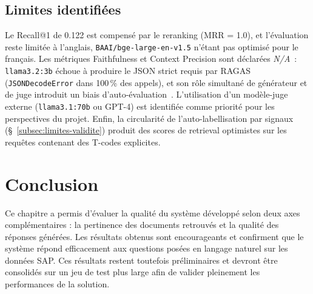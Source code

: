 \subsection{Limites identifiées}
\label{subsec:limites-ragas}

Le Recall@1 de 0.122 est compensé par le reranking (MRR = 1.0), et l'évaluation reste limitée à l'anglais, \texttt{BAAI/bge-large-en-v1.5} n'étant pas optimisé pour le français. Les métriques Faithfulness et Context Precision sont déclarées \textit{N/A}~: \texttt{llama3.2:3b} échoue à produire le JSON strict requis par RAGAS (\texttt{JSONDecodeError} dans 100\,\% des appels), et son rôle simultané de générateur et de juge introduit un biais d'auto-évaluation~\cite{es2023ragas}. L'utilisation d'un modèle-juge externe (\texttt{llama3.1:70b} ou GPT-4) est identifiée comme priorité pour les perspectives du projet. Enfin, la circularité de l'auto-labellisation par signaux (§~\ref{subsec:limites-validite}) produit des scores de retrieval optimistes sur les requêtes contenant des T-codes explicites.

\section*{Conclusion}

Ce chapitre a permis d'évaluer la qualité du système développé selon deux axes complémentaires : la pertinence des documents retrouvés et la qualité des réponses générées. Les résultats obtenus sont encourageants et confirment que le système répond efficacement aux questions posées en langage naturel sur les données SAP. Ces résultats restent toutefois préliminaires et devront être consolidés sur un jeu de test plus large afin de valider pleinement les performances de la solution.

